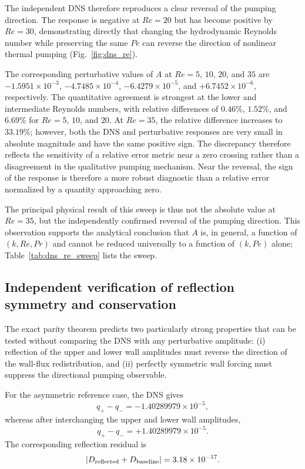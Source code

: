 \documentclass[12pt,a4paper]{article}
\newcommand{\Rey}{\mathit{Re}}
\newcommand{\Pe}{\mathit{Pe}}
\renewcommand{\Pr}{\mathit{Pr}}
\begin{document}
The independent DNS therefore reproduces a clear reversal of the pumping
direction. The response is negative at $\Rey=20$ but has become positive by
$\Rey=30$, demonstrating directly that changing the hydrodynamic Reynolds
number while preserving the same $\Pe$ can reverse the direction of nonlinear
thermal pumping (Fig.~\ref{fig:dns_re}).

The corresponding perturbative values of $A$ at $\Rey=5$, $10$, $20$, and $35$ are
$-1.5951\times10^{-3}$, $-4.7485\times10^{-4}$,
$-6.4279\times10^{-5}$, and $+6.7452\times10^{-6}$, respectively. The
quantitative agreement is strongest at the lower and intermediate Reynolds
numbers, with relative differences of $0.46\%$, $1.52\%$, and $6.69\%$ for
$\Rey=5$, $10$, and $20$. At $\Rey=35$, the relative difference increases to
$33.19\%$; however, both the DNS and perturbative responses are very small in
absolute magnitude and have the same positive sign. The discrepancy therefore
reflects the sensitivity of a relative error metric near a zero crossing rather
than a disagreement in the qualitative pumping mechanism. Near the reversal,
the sign of the response is therefore a more robust diagnostic than a relative
error normalized by a quantity approaching zero.

The principal physical result of this sweep is thus not the absolute value at
$\Rey=35$, but the independently confirmed reversal of the pumping direction.
This observation supports the analytical conclusion that $A$ is, in general,
a function of $(k,\Rey,\Pr)$ and cannot be reduced universally to a function
of $(k,\Pe)$ alone; Table~\ref{tab:dns_re_sweep} lists the sweep.

\subsection{Independent verification of reflection symmetry and conservation}
\label{subsec:dns_symmetry}

The exact parity theorem predicts two particularly strong properties that can
be tested without comparing the DNS with any perturbative amplitude:
(i) reflection of the upper and lower wall amplitudes must reverse the
direction of the wall-flux redistribution, and (ii) perfectly symmetric
wall forcing must suppress the directional pumping observable.

For the asymmetric reference case, the DNS gives
\begin{equation}
q_+-q_- = -1.40289979\times10^{-5},
\end{equation}
whereas after interchanging the upper and lower wall amplitudes,
\begin{equation}
q_+-q_- = +1.40289979\times10^{-5}.
\end{equation}
The corresponding reflection residual is
\begin{equation}
\left|
D_{\rm reflected}+D_{\rm baseline}
\right| = 3.18\times10^{-17}.
\end{equation}
\end{document}
